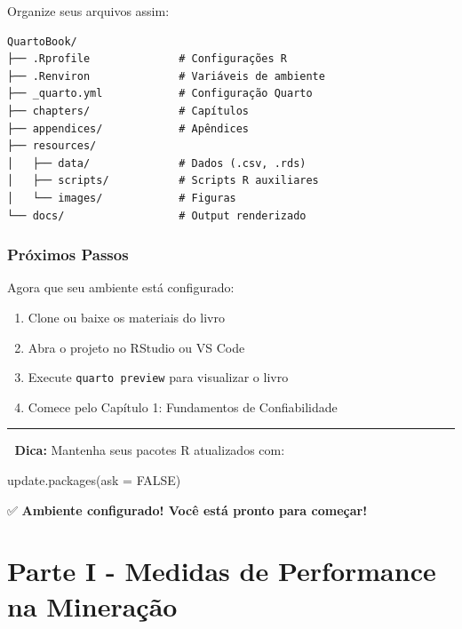 \documentclass[
  letterpaper,
]{book}
\newenvironment{Shaded}{\begin{snugshade}}{\end{snugshade}}
\newcommand{\AttributeTok}[1]{\textcolor[rgb]{0.40,0.45,0.13}{#1}}
\newcommand{\ConstantTok}[1]{\textcolor[rgb]{0.56,0.35,0.01}{#1}}
\newcommand{\FunctionTok}[1]{\textcolor[rgb]{0.28,0.35,0.67}{#1}}
\newcommand{\NormalTok}[1]{\textcolor[rgb]{0.00,0.23,0.31}{#1}}
\providecommand{\tightlist}{%
  \setlength{\itemsep}{0pt}\setlength{\parskip}{0pt}}\usepackage{longtable,booktabs,array}
\begin{document}

Organize seus arquivos assim:

\begin{verbatim}
QuartoBook/
├── .Rprofile              # Configurações R
├── .Renviron              # Variáveis de ambiente
├── _quarto.yml            # Configuração Quarto
├── chapters/              # Capítulos
├── appendices/            # Apêndices
├── resources/
│   ├── data/              # Dados (.csv, .rds)
│   ├── scripts/           # Scripts R auxiliares
│   └── images/            # Figuras
└── docs/                  # Output renderizado
\end{verbatim}

\section*{Próximos Passos}\label{pruxf3ximos-passos}


Agora que seu ambiente está configurado:

\begin{enumerate}
\def\labelenumi{\arabic{enumi}.}
\tightlist
\item
  Clone ou baixe os materiais do livro
\item
  Abra o projeto no RStudio ou VS Code
\item
  Execute \texttt{quarto\ preview} para visualizar o livro
\item
  Comece pelo Capítulo 1: Fundamentos de Confiabilidade
\end{enumerate}

\begin{center}\rule{0.5\linewidth}{0.5pt}\end{center}

🔔 \textbf{Dica:} Mantenha seus pacotes R atualizados com:

\begin{Shaded}
\begin{Highlighting}[]
\FunctionTok{update.packages}\NormalTok{(}\AttributeTok{ask =} \ConstantTok{FALSE}\NormalTok{)}
\end{Highlighting}
\end{Shaded}

✅ \textbf{Ambiente configurado! Você está pronto para começar!}

\part{Parte I - Medidas de Performance na Mineração}
\end{document}
